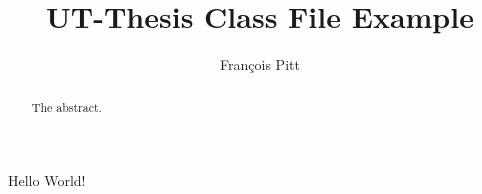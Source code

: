 \documentclass{ut-thesis}
\author{Fran\c{c}ois Pitt}
\title{UT-Thesis Class File Example}
\begin{document}
  \begin{preliminary}
    \maketitle
    \begin{abstract}
      The abstract.
    \end{abstract}
    \tableofcontents
  \end{preliminary}
  Hello World!
\end{document}
